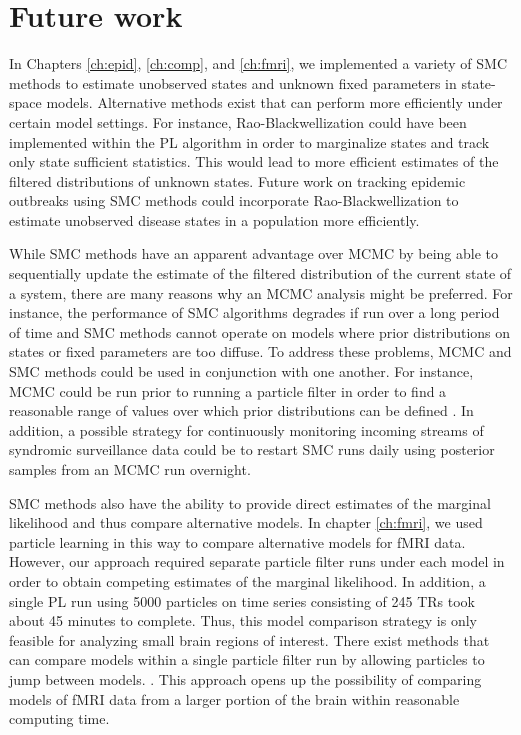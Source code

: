\chapter{Future work \label{sec:future}}

In Chapters \ref{ch:epid}, \ref{ch:comp}, and \ref{ch:fmri}, we implemented a variety of SMC methods to estimate unobserved states and unknown fixed parameters in state-space models. Alternative methods exist that can perform more efficiently under certain model settings. For instance, Rao-Blackwellization \citep{Douc:Gods:Andr:on:2000} could have been implemented within the PL algorithm in order to marginalize states and track only state sufficient statistics. This would lead to more efficient estimates of the filtered distributions of unknown states. Future work on tracking epidemic outbreaks using SMC methods could incorporate Rao-Blackwellization to estimate unobserved disease states in a population more efficiently.

While SMC methods have an apparent advantage over MCMC by being able to sequentially update the estimate of the filtered distribution of the current state of a system, there are many reasons why an MCMC analysis might be preferred. For instance, the performance of SMC algorithms degrades if run over a long period of time and SMC methods cannot operate on models where prior distributions on states or fixed parameters are too diffuse. To address these problems, MCMC and SMC methods could be used in conjunction with one another. For instance, MCMC could be run prior to running a particle filter in order to find a reasonable range of values over which prior distributions can be defined \cite[Chapter 5][]{petris:camp:2009:dynamic}. In addition, a possible strategy for continuously monitoring incoming streams of syndromic surveillance data could be to restart SMC runs daily using posterior samples from an MCMC run overnight.

SMC methods also have the ability to provide direct estimates of the marginal likelihood and thus compare alternative models. In chapter \ref{ch:fmri}, we used particle learning in this way to compare alternative models for fMRI data. However, our approach required separate particle filter runs under each model in order to obtain competing estimates of the marginal likelihood. In addition, a single PL run using 5000 particles on time series consisting of 245 TRs took about 45 minutes to complete. Thus, this model comparison strategy is only feasible for analyzing small brain regions of interest. There exist methods that can compare models within a single particle filter run by allowing particles to jump between models. \citep{berz:gilks:rmcross:2001,zhou:joh:smcmodcomp:2013}. This approach opens up the possibility of comparing models of fMRI data from a larger portion of the brain within reasonable computing time.

